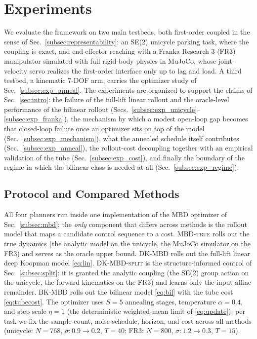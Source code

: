 \documentclass[lettersize,journal]{IEEEtran}
\theoremstyle{remark}
\newcommand{\mbdtrue}{\textsc{MBD-true}}
\newcommand{\dkmbd}{\textsc{DK-MBD}}
\newcommand{\dksplit}{\textsc{DK-MBD-split}}
\newcommand{\bkmbd}{\textsc{BK-MBD}}
\begin{document}
\section{Experiments}\label{sec:exp}
We evaluate the framework on two main testbeds, both first-order coupled
in the sense of Sec.~\ref{subsec:representability}: an SE(2) unicycle
parking task, where the coupling is exact, and end-effector reaching
with a Franka Research 3 (FR3) manipulator simulated with full
rigid-body physics in MuJoCo, whose joint-velocity servo realizes the
first-order interface only up to lag and load.
A third testbed, a kinematic $7$-DOF arm, carries the optimizer study of
Sec.~\ref{subsec:exp_anneal}. The
experiments are organized to support the claims of Sec.~\ref{sec:intro}:
the failure of the full-lift linear rollout and the oracle-level
performance of the bilinear rollout
(Secs.~\ref{subsec:exp_unicycle}--\ref{subsec:exp_franka}), the mechanism
by which a modest open-loop gap becomes that closed-loop failure once an
optimizer sits on top of the model (Sec.~\ref{subsec:exp_mechanism}),
what the annealed schedule itself contributes
(Sec.~\ref{subsec:exp_anneal}), the
rollout-cost decoupling together with an empirical validation of the tube
(Sec.~\ref{subsec:exp_cost}), and finally the boundary of the regime in
which the bilinear class is needed at all
(Sec.~\ref{subsec:exp_regime}).

\subsection{Protocol and Compared Methods}\label{subsec:setup}

All four planners run inside one implementation of the MBD optimizer of
Sec.~\ref{subsec:mbd}; the \emph{only} component that differs across
methods is the rollout model that maps a candidate control sequence to a
cost. \mbdtrue{} rolls out the true dynamics (the analytic model on the
unicycle, the MuJoCo simulator on the FR3) and serves as the oracle
upper bound. \dkmbd{} rolls out the full-lift linear deep Koopman model
\eqref{eq:lin}. \dksplit{} is the structure-informed control of
Sec.~\ref{subsec:split}: it is granted the analytic coupling (the SE(2)
group action on the unicycle, the forward kinematics on the FR3) and
learns only the input-affine remainder. \bkmbd{} rolls out the bilinear
model \eqref{eq:bil} with the tube cost \eqref{eq:tubecost}. The optimizer
uses $S = 5$ annealing stages, temperature $\alpha = 0.4$, and step scale
$\eta = 1$ (the deterministic weighted-mean limit of \eqref{eq:update});
per task we fix the sample count, noise schedule, horizon, and cost across
all methods (unicycle: $N = 768$, $\sigma\!: 0.9 \to 0.2$, $T = 40$;
FR3: $N = 800$, $\sigma\!: 1.2 \to 0.3$, $T = 15$).
\end{document}
